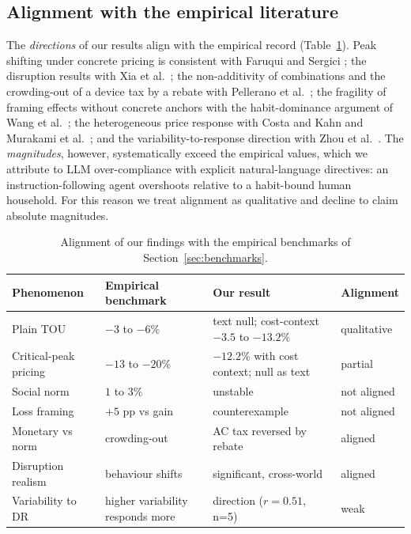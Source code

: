 \documentclass[11pt]{article}
\begin{document}
\subsection{Alignment with the empirical literature}
The \emph{directions} of our results align with the empirical record (Table~\ref{tab:align}). Peak
shifting under concrete pricing is consistent with Faruqui and Sergici \cite{faruqui2010}; the disruption
results with Xia et al.\ \cite{xia2026}; the non-additivity of combinations and the crowding-out of a
device tax by a rebate with Pellerano et al.\ \cite{pellerano2017}; the fragility of framing effects
without concrete anchors with the habit-dominance argument of Wang et al.\ \cite{wang2021}; the
heterogeneous price response with Costa and Kahn \cite{costa2010} and Murakami et al.\ \cite{murakami2022};
and the variability-to-response direction with Zhou et al.\ \cite{zhou2016}. The \emph{magnitudes},
however, systematically exceed the empirical values, which we attribute to LLM over-compliance with
explicit natural-language directives: an instruction-following agent overshoots relative to a habit-bound
human household. For this reason we treat alignment as qualitative and decline to claim absolute
magnitudes.

\begin{table}[ht]
\centering\small
\begin{tabular}{llll}
\toprule
Phenomenon & Empirical benchmark & Our result & Alignment \\
\midrule
Plain TOU & $-3$ to $-6\%$ & text null; cost-context $-3.5$ to $-13.2\%$ & qualitative \\
Critical-peak pricing & $-13$ to $-20\%$ & $-12.2\%$ with cost context; null as text & partial \\
Social norm & $1$ to $3\%$ & unstable & not aligned \\
Loss framing & $+5$ pp vs gain & counterexample & not aligned \\
Monetary vs norm & crowding-out & AC tax reversed by rebate & aligned \\
Disruption realism & behaviour shifts & significant, cross-world & aligned \\
Variability to DR & higher variability responds more & direction ($r=0.51$, n=5) & weak \\
\bottomrule
\end{tabular}
\caption{Alignment of our findings with the empirical benchmarks of Section~\ref{sec:benchmarks}.}
\label{tab:align}
\end{table}
\end{document}

